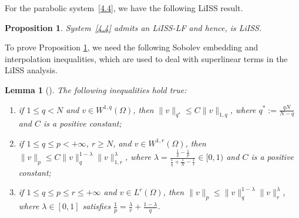\documentclass[onecolumn]{autart}
\newtheorem{lemma}{Lemma}
\newtheorem{proposition}{Proposition}
\newenvironment{proof of Prop.ODE}{{\it Proof of Proposition~\ref{Prop.ODE}:\enspace}}{\hfill $\blacksquare$\par}
\newenvironment{proof of PDE}{{\it Proof of Proposition \ref{Prop.8}:\enspace}}{\hfill $\blacksquare$\par}
\begin{document}
{For the parabolic system~\eqref{4.4}, we have the following LiISS result.
\begin{proposition} \label{Prop.8}
	System~\eqref{4.4} admits an LiISS-LF and hence, is LiISS.
\end{proposition}




To prove Proposition \ref{Prop.8}, we need the following Sobolev embedding and interpolation inequalities, which are used to deal with superlinear terms in the LiISS analysis.
\begin{lemma}[{\cite[pp. 285, 313, 314, 119]{Brezis2011function}}] \label{interpolation}
	The following inequalities hold true:
	\begin{enumerate}
		\item[(i)] if $ 1\leq q<N$ and $v\in W^{1,q}(\Omega)$, then $\|v\|_{q^*}\leq C\|v\|_{1,q}$, where $q^*:=\frac{qN}{N-q}$ {and $C$ is a positive constant};
		\item[(ii)] if  $ 1\leq q\leq p< +\infty$, $r\geq N$, and $v\in W^{1,r}(\Omega)$, then $\|v\|_p\leq C\|v\|_q^{1-{\lambda}}\|v\|_{1,r}^{{\lambda}}$,
		where ${\lambda}=\frac{\frac{1}{q}-\frac{1}{p}} {\frac{1}{q}+\frac{1}{N}-\frac{1}{r}}\in [0,1)$ and   $C$ is a positive constant;
		\item[(iii)] if $ 1\leq q\leq p\leq r\leq +\infty$ and $v\in L^{r}(\Omega)$, then $\|v\|_p\leq \|v\|_q^{1-{\lambda}}\|v\|_{r}^{{\lambda}}$,
		where ${\lambda}\in [0,1]$ {satisfies} $\frac{1}{p}=\frac{{\lambda}}{r}+\frac{1-{\lambda}}{q}$.
	\end{enumerate}
\end{lemma}


}
\end{document}

